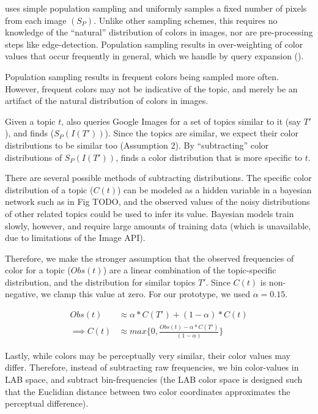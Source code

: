\system uses simple population sampling and uniformly samples a fixed number of pixels from each image $(S_{P})$. Unlike other sampling schemes, this requires no knowledge of the ``natural'' distribution of colors in images, nor are pre-processing steps like edge-detection. Population sampling results in over-weighting of color values that occur frequently in general, which we handle by query expansion ().

Population sampling results in frequent colors being sampled more often. However, frequent colors may not be indicative of the topic, and merely be an artifact of the natural distribution of colors in images. 

Given a topic $t$, \system also queries Google Images for a set of topics similar to it (say $T'$), and finds ($S_{P}(I(T'))$). Since the topics are similar, we expect their color distributions to be similar too (Assumption 2). By ``subtracting'' color distributions of $S_{P}(I(T'))$, \system finds a color distribution that is more specific to $t$. 

There are several possible methods of subtracting distributions. The specific color distribution of a topic ($C(t)$) can be modeled as a hidden variable in a bayesian network such as in Fig TODO, and the observed values of the noisy distributions of other related topics could be used to infer its value. Bayesian models train slowly, however, and require large amounts of training data (which is unavailable, due to limitations of the Image API).

Therefore, we make the stronger assumption that the observed frequencies of color for a topic ($Obs(t)$) are a linear combination of the topic-specific distribution, and the distribution for similar topics $T'$. Since $C(t)$ is non-negative, we clamp this value at zero. For our prototype, we used $\alpha = 0.15$.

\begin{align}
\label{linear-color}
Obs(t) &\approx \alpha*C(T') + (1-\alpha)*C(t) \\
\implies  C(t) &\approx max\{0,\frac{Obs(t) - \alpha*C(T')}{(1-\alpha)}\}
\end{align}

Lastly, while colors may be perceptually very similar, their color values may differ. Therefore, instead of subtracting raw frequencies, we bin color-values in LAB space, and subtract bin-frequencies (the LAB color space is designed such that the Euclidian distance between two color coordinates approximates the perceptual difference). 

